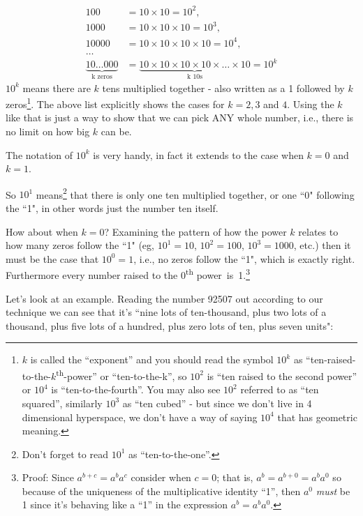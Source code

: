 \documentclass{article}
\begin{document}
\begin{align*}
100&=10\times10=10^2,\\
1000&= 10\times10\times10=10^3,\\
10000&= 10\times10\times10\times10=10^4,\\
\dots{}\\
\underbrace{10\dots{}000}_\text{k zeros}&= \underbrace{10\times10\times10\times10\times\dots{}\times10}_\text{k 10s}=10^k
\end{align*}
$10^k$ means there are $k$ tens multiplied together - 
also written as a 1 followed by $k$ zeros\footnote{$k$ is called the ``exponent'' and you should
read the symbol $10^k$ as ``ten-raised-to-the-$k$\textsuperscript{th}-power'' or ``ten-to-the-k'',
so $10^2$ is ``ten raised to the second power'' or $10^4$ is ``ten-to-the-fourth''.
You may also see $10^2$ referred to as ``ten squared'',
similarly $10^3$ as ``ten cubed'' - but since we 
don't live in 4 dimensional hyperspace,
we don't have a way of saying $10^4$ that has geometric meaning.}.
The above list explicitly shows the cases for $k = 2, 3$ and $4$.
Using the $k$ like that is just a way to show that we can pick ANY whole number,
i.e., there is no limit on how big $k$ can be.

The notation of $10^k$ is very handy, in fact it extends
to the case when $k=0$ and $k=1$.

So $10^1$ means\footnote{Don't forget to read $10^1$
as ``ten-to-the-one''.} that there is only one ten multiplied together,
or one ``0" following the ``1",
in other words just the number ten itself.

How about when $k=0$?
Examining the pattern of how the power $k$ relates to how many zeros follow the ``1"
(eg, $10^1=10$, $10^2=100$, $10^3=1000$,
etc.) then it must be the case that $10^0=1$,
i.e., no zeros follow the ``1", which is exactly right.
Furthermore every number raised to the 0\textsuperscript{th}
power~is~1.\footnote{Proof: Since $a^{b+c}=a^ba^c$ consider when $c=0$; that is,
$a^b=a^{b+0}=a^ba^0$ so because of the uniqueness
of the multiplicative identity ``1'', then $a^0$ \emph{must} be 1 since it's behaving 
like a ``1'' in the expression $a^b=a^ba^0$.}

Let's look at an example.
Reading the number 92507 out according to our technique we can see
that it's ``nine lots of ten-thousand,
plus two lots of a thousand, plus five lots of a hundred,
plus zero lots of ten, plus seven units":
\end{document}

